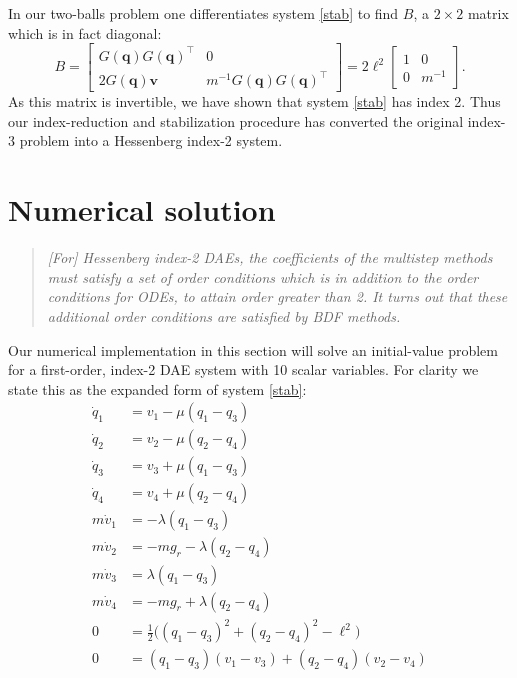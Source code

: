 \documentclass[letterpaper,final,12pt,reqno]{amsart}
\newcommand{\bq}{\mathbf{q}}
\newcommand{\bv}{\mathbf{v}}
\begin{document}
In our two-balls problem one differentiates system \eqref{stab} to find $B$, a $2\times 2$ matrix which is in fact diagonal:
\begin{equation}
B = \begin{bmatrix}  G(\bq) G(\bq)^\top & 0 \\ 2 G(\bq) \bv & m^{-1} G(\bq) G(\bq)^\top \end{bmatrix} = 2\ell^2 \begin{bmatrix}  1 & 0 \\ 0 & m^{-1} \end{bmatrix}.
\end{equation}
As this matrix is invertible, we have shown that system \eqref{stab} has index 2.  Thus our index-reduction and stabilization procedure has converted the original index-3 problem into a Hessenberg index-2 system.


\section{Numerical solution}

\begin{quote}
\emph{[For] Hessenberg index-2 DAEs, the coefficients of the multistep methods must satisfy a set of order conditions which is in addition to the order conditions for ODEs, to attain order greater than 2.  It turns out that these additional order conditions are satisfied by BDF methods.} \, \cite[p 267]{AscherPetzold1998}
\end{quote}

Our numerical implementation in this section will solve an initial-value problem for a first-order, index-2 DAE system with 10 scalar variables.  For clarity we state this as the expanded form of system \eqref{stab}:
\begin{subequations}
\label{rawstab}
\begin{align}
  \dot q_1 &= v_1 - \mu (q_1 - q_3) \\
  \dot q_2 &= v_2 - \mu (q_2 - q_4) \\
  \dot q_3 &= v_3 + \mu (q_1 - q_3) \\
  \dot q_4 &= v_4 + \mu (q_2 - q_4) \\
m \dot v_1 &= - \lambda (q_1 - q_3) \\
m \dot v_2 &= - m g_r - \lambda (q_2 - q_4) \\
m \dot v_3 &= \lambda (q_1 - q_3) \\
m \dot v_4 &= - m g_r + \lambda (q_2 - q_4) \\
         0 &= \frac{1}{2} \Big((q_1 - q_3)^2 + (q_2 - q_4)^2 - \ell^2\Big) \\
         0 &= (q_1 - q_3) (v_1 - v_3) + (q_2 - q_4) (v_2 - v_4)
\end{align}
\end{subequations}
\end{document}
